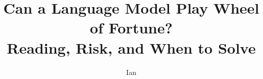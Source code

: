 \documentclass[11pt]{article}
\title{Can a Language Model Play Wheel of Fortune?\\Reading, Risk, and When to Solve}
\author{Ian %
}
\date{}
\begin{document}
\maketitle

\begin{abstract}
\end{abstract}


















\appendix

\end{document}
